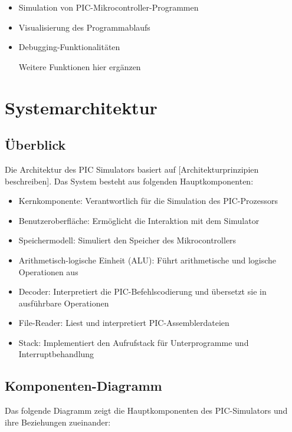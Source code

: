 \documentclass[a4paper,11pt]{report}
\begin{document}
\begin{itemize}
    \item Simulation von PIC-Mikrocontroller-Programmen
    \item Visualisierung des Programmablaufs
    \item Debugging-Funktionalitäten
    \item [Weitere Funktionen hier ergänzen]
\end{itemize}

\chapter{Systemarchitektur}

\section{Überblick}
Die Architektur des PIC Simulators basiert auf [Architekturprinzipien beschreiben]. Das System besteht aus folgenden Hauptkomponenten:

\begin{itemize}
    \item Kernkomponente: Verantwortlich für die Simulation des PIC-Prozessors
    \item Benutzeroberfläche: Ermöglicht die Interaktion mit dem Simulator
    \item Speichermodell: Simuliert den Speicher des Mikrocontrollers
    \item Arithmetisch-logische Einheit (ALU): Führt arithmetische und logische Operationen aus
    \item Decoder: Interpretiert die PIC-Befehlscodierung und übersetzt sie in ausführbare Operationen
    \item File-Reader: Liest und interpretiert PIC-Assemblerdateien
    \item Stack: Implementiert den Aufrufstack für Unterprogramme und Interruptbehandlung
\end{itemize}

\section{Komponenten-Diagramm}
Das folgende Diagramm zeigt die Hauptkomponenten des PIC-Simulators und ihre Beziehungen zueinander:
\end{document}

